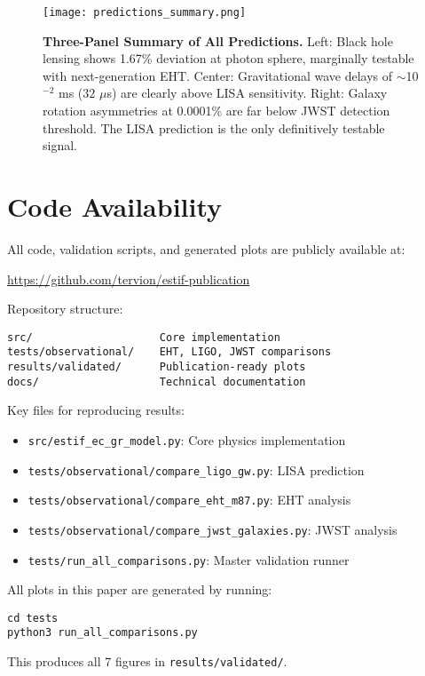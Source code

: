 \documentclass[12pt]{article}
\begin{document}
\begin{figure}[h!]
\centering
\texttt{[image: predictions\_summary.png]}
\caption{\textbf{Three-Panel Summary of All Predictions.} Left: Black hole lensing shows 1.67\% deviation at photon sphere, marginally testable with next-generation EHT. Center: Gravitational wave delays of $\sim$10$^{-2}$ ms ($32$ $\mu$s) are clearly above LISA sensitivity. Right: Galaxy rotation asymmetries at 0.0001\% are far below JWST detection threshold. The LISA prediction is the only definitively testable signal.}
\label{fig:summary}
\end{figure}

\section{Code Availability}

All code, validation scripts, and generated plots are publicly available at:

\url{https://github.com/tervion/estif-publication}

Repository structure:
\begin{verbatim}
src/                    Core implementation
tests/observational/    EHT, LIGO, JWST comparisons  
results/validated/      Publication-ready plots
docs/                   Technical documentation
\end{verbatim}

Key files for reproducing results:
\begin{itemize}
    \item \texttt{src/estif\_ec\_gr\_model.py}: Core physics implementation
    \item \texttt{tests/observational/compare\_ligo\_gw.py}: LISA prediction
    \item \texttt{tests/observational/compare\_eht\_m87.py}: EHT analysis
    \item \texttt{tests/observational/compare\_jwst\_galaxies.py}: JWST analysis
    \item \texttt{tests/run\_all\_comparisons.py}: Master validation runner
\end{itemize}

All plots in this paper are generated by running:
\begin{verbatim}
cd tests
python3 run_all_comparisons.py
\end{verbatim}

This produces all 7 figures in \texttt{results/validated/}.
\end{document}
